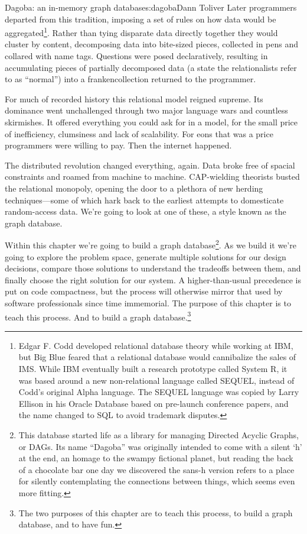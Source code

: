 \begin{aosachapter}{Dagoba: an in-memory graph database}{s:dagoba}{Dann Toliver}
Later programmers departed from this tradition, imposing a set of rules
on how data would be aggregated\footnote{Edgar F. Codd developed
  relational database theory while working at IBM, but Big Blue feared
  that a relational database would cannibalize the sales of IMS. While
  IBM eventually built a research prototype called System R, it was
  based around a new non-relational language called SEQUEL, instead of
  Codd's original Alpha language. The SEQUEL language was copied by
  Larry Ellison in his Oracle Database based on pre-launch conference
  papers, and the name changed to SQL to avoid trademark disputes.}.
Rather than tying disparate data directly together they would cluster by
content, decomposing data into bite-sized pieces, collected in pens and
collared with name tags. Questions were posed declaratively, resulting
in accumulating pieces of partially decomposed data (a state the
relationalists refer to as ``normal'') into a frankencollection returned
to the programmer.

For much of recorded history this relational model reigned supreme. Its
dominance went unchallenged through two major language wars and
countless skirmishes. It offered everything you could ask for in a
model, for the small price of inefficiency, clumsiness and lack of
scalability. For eons that was a price programmers were willing to pay.
Then the internet happened.

The distributed revolution changed everything, again. Data broke free of
spacial constraints and roamed from machine to machine. CAP-wielding
theorists busted the relational monopoly, opening the door to a plethora
of new herding techniques---some of which hark back to the earliest
attempts to domesticate random-access data. We're going to look at one
of these, a style known as the graph database.

\label{take-one}

Within this chapter we're going to build a graph database\footnote{This
  database started life as a library for managing Directed Acyclic
  Graphs, or DAGs. Its name ``Dagoba'' was originally intended to come
  with a silent `h' at the end, an homage to the swampy fictional
  planet, but reading the back of a chocolate bar one day we discovered
  the sans-h version refers to a place for silently contemplating the
  connections between things, which seems even more fitting.}. As we
build it we're going to explore the problem space, generate multiple
solutions for our design decisions, compare those solutions to
understand the tradeoffs between them, and finally choose the right
solution for our system. A higher-than-usual precedence is put on code
compactness, but the process will otherwise mirror that used by software
professionals since time immemorial. The purpose of this chapter is to
teach this process. And to build a graph database.\footnote{The two
  purposes of this chapter are to teach this process, to build a graph
  database, and to have fun.}


\end{aosachapter}
